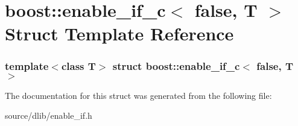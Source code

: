 \hypertarget{structboost_1_1enable__if__c_3_01false_00_01T_01_4}{
\section{boost::enable\_\-if\_\-c$<$ false, T $>$ Struct Template Reference}
\label{structboost_1_1enable__if__c_3_01false_00_01T_01_4}
}
\subsubsection*{template$<$class T$>$ struct boost::enable\_\-if\_\-c$<$ false, T $>$}



The documentation for this struct was generated from the following file:\begin{DoxyCompactItemize}
\item 
source/dlib/enable\_\-if.h\end{DoxyCompactItemize}
